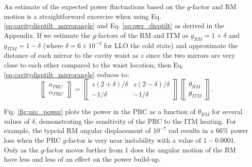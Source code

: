 An estimate of the expected power fluctuations based on the $g$-factor
and RM motion is a straightforward excercise when using
Eq. \ref{eq:cavitydisptilt_mirrorangle} and Eq. \ref{eq:pwr_disptilt}
as derived in the Appendix. If we estimate the $g$-factors of the RM
and ITM as $g_{RM} = 1+\delta$ and $g_{ITM} = 1 - \delta$ (where
$\delta =6 \times 10^{-4}$ for LLO the cold state) and approximate the
distance of each mirror to the cavity waist as $z$ since the two
mirrors are very close to each other compared to the waist location,
then Eq. \ref{eq:cavitydisptilt_mirrorangle} reduces to:
\begin{equation}
\left\llbracket \begin{array}{c}
a_{PRC} \\
\alpha_{PRC} \end{array} \right\rrbracket = 
\left\llbracket \begin{array}{cc}
z(2+\delta)/\delta & z(2-\delta)/\delta \\
-1/\delta & -1/\delta \end{array} \right\rrbracket
\left\llbracket \begin{array}{c}
\theta_{RM}\\
\theta_{ITM} \end{array} \right\rrbracket.
\end{equation}

Fig. \ref{fig:prc_power} plots the power in the PRC as a function of
$\theta_{RM}$ for several values of $\delta$, demonstrating
the sensitivity of the PRC to the ITM heating.  For example, the
typcial RM angular displacement of $10^{-7}$ rad results in a 66\%
power loss when the PRC $g$-factor is very near instability with a
value of $1-0.0001$. Only as the $g$-factor moves further from $1$
does the angular motion of the RM have less and less of an effect on
the power build-up.


